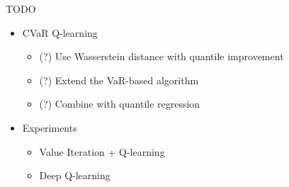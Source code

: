 \documentclass{beamer}
\begin{document}
\begin{frame}{TODO}

\begin{itemize}
\item CVaR Q-learning
\begin{itemize}
\item (?) Use Wasserstein distance with quantile improvement
\item (?) Extend the VaR-based algorithm
\item (?) Combine with quantile regression
\end{itemize}

\item Experiments
\begin{itemize}
\item Value Iteration + Q-learning
\item Deep Q-learning
\end{itemize}



\end{itemize}



\end{frame}

\end{document}
